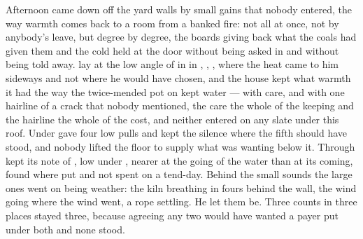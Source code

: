 Afternoon came down off the yard walls by small gains that nobody entered, the way warmth comes back to a room from a banked fire: not all at once, not by anybody's leave, but degree by degree, the boards giving back what the coals had given them and the cold held at the door without being asked in and without being told away.  lay at the low angle of  in  in , , , where the heat came to him sideways and not where he would have chosen, and the house kept what warmth it had the way the twice-mended pot on  kept water --- with care, and with one hairline of a crack that nobody mentioned, the care the whole of the keeping and the hairline the whole of the cost, and neither entered on any slate under this roof. Under   gave four low pulls and kept the silence where the fifth should have stood, and nobody lifted the floor to supply what was wanting below it. Through   kept its note of , low under , nearer at the going of the water than at its coming, found where put and not spent on a tend-day. Behind the small sounds the large ones went on being weather: the kiln breathing in fours behind the wall, the wind going where the wind went, a rope settling. He let them be. Three counts in three places stayed three, because agreeing any two would have wanted a payer put under both and none stood.

